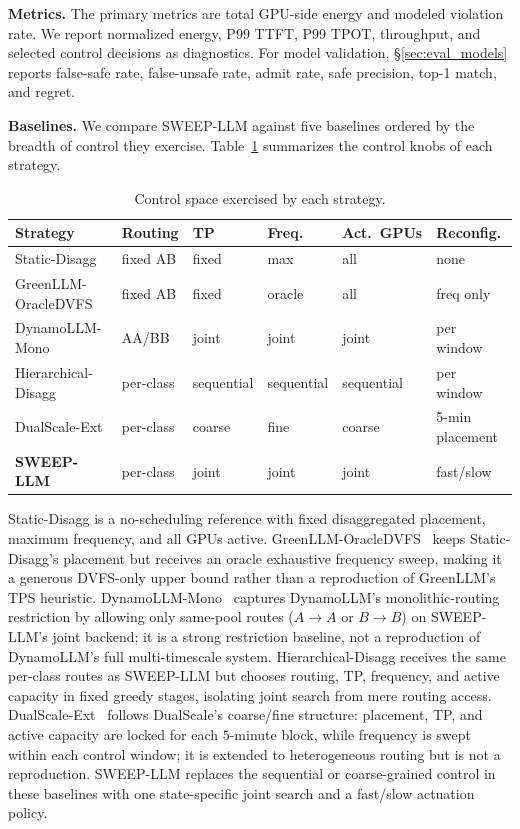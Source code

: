 \textbf{Metrics.}
The primary metrics are total GPU-side energy and modeled violation rate.
We report normalized energy, P99 TTFT, P99 TPOT, throughput, and selected control decisions as diagnostics.
For model validation, \S\ref{sec:eval_models} reports false-safe rate, false-unsafe rate, admit rate, safe precision, top-1 match, and regret.

\textbf{Baselines.}
We compare SWEEP-LLM against five baselines ordered by the breadth of control they exercise.
Table~\ref{tab:baselines} summarizes the control knobs of each strategy.

\begin{table}[t]
\centering
\small
\setlength{\tabcolsep}{4pt}
\caption{Control space exercised by each strategy.}
\label{tab:baselines}
\begin{tabular}{@{}llllll@{}}
\toprule
Strategy & Routing & TP & Freq.\ & Act.\ GPUs & Reconfig. \\
\midrule
Static-Disagg        & fixed AB  & fixed      & max        & all        & none \\
GreenLLM-OracleDVFS  & fixed AB  & fixed      & oracle     & all        & freq only \\
DynamoLLM-Mono       & AA/BB     & joint      & joint      & joint      & per window \\
Hierarchical-Disagg  & per-class & sequential & sequential & sequential & per window \\
DualScale-Ext        & per-class & coarse     & fine       & coarse     & 5-min placement \\
\textbf{SWEEP-LLM}   & per-class & joint      & joint      & joint      & fast/slow \\
\bottomrule
\end{tabular}
\end{table}

Static-Disagg is a no-scheduling reference with fixed disaggregated placement, maximum frequency, and all GPUs active.
GreenLLM-OracleDVFS~\cite{ye2025greenllm} keeps Static-Disagg's placement but receives an oracle exhaustive frequency sweep, making it a generous DVFS-only upper bound rather than a reproduction of GreenLLM's TPS heuristic.
DynamoLLM-Mono~\cite{stojkovic2024dynamollm} captures DynamoLLM's monolithic-routing restriction by allowing only same-pool routes ($A{\to}A$ or $B{\to}B$) on SWEEP-LLM's joint backend; it is a strong restriction baseline, not a reproduction of DynamoLLM's full multi-timescale system.
Hierarchical-Disagg receives the same per-class routes as SWEEP-LLM but chooses routing, TP, frequency, and active capacity in fixed greedy stages, isolating joint search from mere routing access.
DualScale-Ext~\cite{biscale2025} follows DualScale's coarse/fine structure: placement, TP, and active capacity are locked for each $5$-minute block, while frequency is swept within each control window; it is extended to heterogeneous routing but is not a reproduction.
SWEEP-LLM replaces the sequential or coarse-grained control in these baselines with one state-specific joint search and a fast/slow actuation policy.

